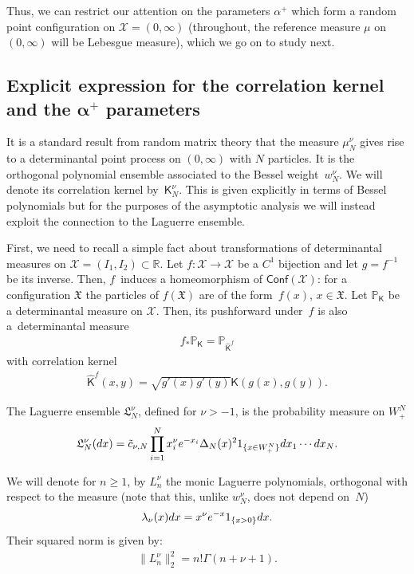 \documentclass[11pt]{article}
\numberwithin{equation}{section}
\begin{document}
Thus, we can restrict our attention on the parameters $\alpha^+$ which form a random point configuration on $\mathcal{X}=(0,\infty)$ (throughout, the reference measure $\mu$ on $(0,\infty)$ will be Lebesgue measure), which we go on to study next.

\subsection[Explicit expression for the correlation kernel and the $\alpha^+$ parameters]{Explicit expression for the correlation kernel and the $\boldsymbol{\alpha^+}$ parameters}\label{section4.2}

 It is a standard result from random matrix theory that the measure $\mu^{\nu}_N$ gives rise to a determinantal point process on $(0,\infty)$ with $N$ particles. It is the orthogonal polynomial ensemble associated to the Bessel weight~$w_N^{\nu}$. We will denote its correlation kernel by~$\mathsf{K}_N^{\nu}$. This is given explicitly in terms of Bessel polynomials but for the purposes of the asymptotic analysis we will instead exploit the connection to the Laguerre ensemble.

First, we need to recall a simple fact about transformations of determinantal measures on $\mathcal{X}=(I_1,I_2) \subset \mathbb{R}$. Let $f\colon \mathcal{X} \to \mathcal{X}$ be a $C^1$ bijection and let $g=f^{-1}$ be its inverse. Then, $f$~induces a homeomorphism of $\mathsf{Conf}(\mathcal{X})$: for a configuration $\mathfrak{X}$ the particles of $f(\mathfrak{X})$ are of the form~$f(x)$, $x \in \mathfrak{X}$. Let $\mathbb{P}_{\mathsf{K}}$ be a determinantal measure on $\mathcal{X}$. Then, its pushforward under~$f$ is also a~determinantal measure
\begin{gather*}
f_*\mathbb{P}_{\mathsf{K}}=\mathbb{P}_{\hat{\mathsf{K}}^f}
\end{gather*}
with correlation kernel
\begin{gather*}
\hat{\mathsf{K}}^f(x,y)=\sqrt{g'(x)g'(y)}\mathsf{K}(g(x),g(y)).
\end{gather*}

The Laguerre ensemble $\mathfrak{L}_N^{\nu}$, defined for $\nu>-1$, is the probability measure on $W^N_+$
\begin{gather*}
\mathfrak{L}_N^{\nu}({\rm d}x)=\tilde{c}_{\nu,N} \prod_{i=1}^{N}x_i^{\nu}{\rm e}^{-x_i}\Delta_N(x)^2 \textbf{1}_{\{x \in W^N_+\}} {\rm d}x_1\cdots {\rm d}x_N.
\end{gather*}

We will denote for $n\ge 1$, by $L_n^{\nu}$ the monic Laguerre polynomials, orthogonal with respect to the measure (note that this, unlike $w^{\nu}_N$, does not depend on~$N$)
\begin{gather*}
\lambda_\nu(x){\rm d}x=x^{\nu} {\rm e}^{-x}\textbf{1}_{\{x>0\}}{\rm d}x.
\end{gather*}
Their squared norm is given by:
\begin{gather*}
\|L_n^{\nu}\|_2^2=n! \Gamma(n+\nu+1).
\end{gather*}
\end{document}
